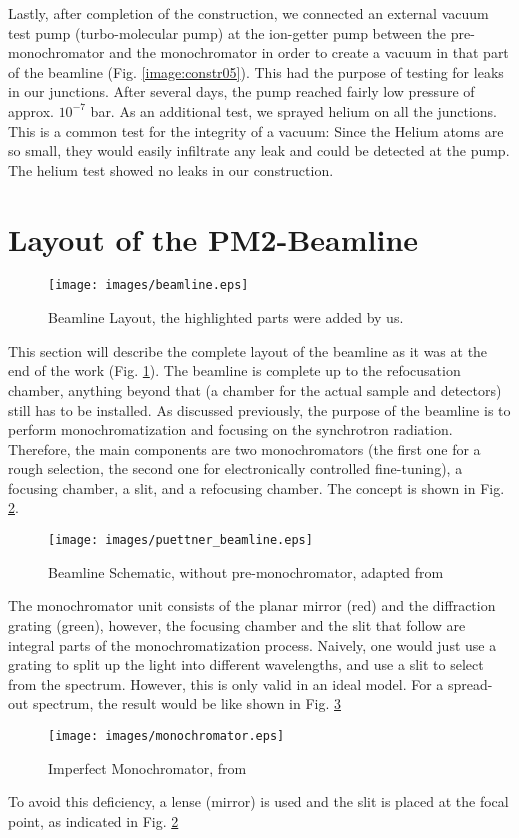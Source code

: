 \documentclass[a4paper,10pt]{article}
\begin{document}
    Lastly, after completion of the construction, we connected an external
vacuum test pump (turbo-molecular pump) at the ion-getter pump between the
pre-monochromator and the
monochromator in order to create a vacuum in that part of the beamline (Fig.
\ref{image:constr05}). This had the purpose of testing for leaks in our
junctions. After several days, the pump reached fairly low pressure of approx.
$10^{-7}$ \milli{}bar. As an additional test, we sprayed helium on all the
junctions. This is a common test for the integrity of a vacuum: Since the Helium
atoms are so small, they would easily infiltrate any leak and could be detected
at the pump. The helium test showed no leaks in our construction.
\section{Layout of the PM2-Beamline} \label{Layout of the PM2-Beamline}

\begin{figure}[htbp]
    \centering
    \texttt{[image: images/beamline.eps]}
    \caption{Beamline Layout, the highlighted parts were added by us.}
  \label{image:beamline}
\end{figure}

    This section will describe the complete layout of the beamline as it was at
the end of the work (Fig. \ref{image:beamline}). The beamline is complete up to
the refocusation chamber, anything beyond that (a chamber for the actual sample
and detectors) still has to be installed. As discussed previously, the purpose
of the beamline is to perform monochromatization and focusing on the synchrotron
radiation. Therefore, the main components are two monochromators (the first
one for a rough selection, the second one for electronically controlled
fine-tuning), a focusing chamber, a slit, and a refocusing chamber. The concept
is shown in Fig. \ref{image:puettner_beamline}.
\begin{figure}[htbp]
    \centering
    \texttt{[image: images/puettner\_beamline.eps]}
    \caption{Beamline Schematic, without pre-monochromator, adapted from
\citep{puettner_slides}}
  \label{image:puettner_beamline}
\end{figure}

    The monochromator unit consists of the planar mirror (red) and the
diffraction grating (green), however, the focusing chamber and the slit that
follow are integral parts of the monochromatization process. Naively, one would
just use a grating to split up the light into different wavelengths, and use a
slit to select from the spectrum. However, this is only valid in an ideal model.
For a spread-out spectrum, the result would be like shown in Fig.
\ref{image:monochromator}
\begin{figure}[htbp]
    \centering
    \texttt{[image: images/monochromator.eps]}
    \caption{Imperfect Monochromator, from
\citep{puettner_slides}}
  \label{image:monochromator}
\end{figure}
To avoid this deficiency, a lense (mirror) is used and the slit is placed at the
focal point, as indicated in Fig. \ref{image:puettner_beamline}
\end{document}

